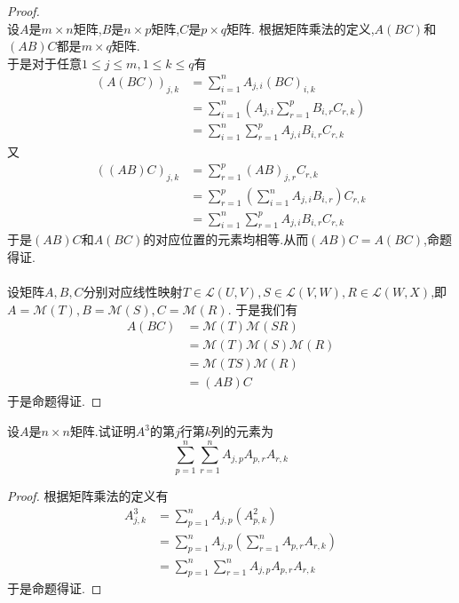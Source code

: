 \documentclass{ctexart}
\begin{document}
\begin{proof}
    \\
    设$A$是$m\times n$矩阵,$B$是$n\times p$矩阵,$C$是$p\times q$矩阵.
    根据矩阵乘法的定义,$A(BC)$和$(AB)C$都是$m\times q$矩阵.\\
    于是对于任意$1\leqslant j\leqslant m,1\leqslant k\leqslant q$有
    $$\begin{aligned}
        (A(BC))_{j,k}
        &= \sum_{i=1}^{n}A_{j,i}(BC)_{i,k} \\
        &= \sum_{i=1}^{n}\left(A_{j,i}\sum_{r=1}^{p}B_{i,r}C_{r,k}\right) \\
        &= \sum_{i=1}^{n}\sum_{r=1}^{p}A_{j,i}B_{i,r}C_{r,k}
    \end{aligned}$$
    又$$\begin{aligned}
        ((AB)C)_{j,k}
        &= \sum_{r=1}^{p}(AB)_{j,r}C_{r,k} \\
        &= \sum_{r=1}^{p}\left(\sum_{i=1}^{n}A_{j,i}B_{i,r}\right)C_{r,k} \\
        &= \sum_{i=1}^{n}\sum_{r=1}^{p}A_{j,i}B_{i,r}C_{r,k}
    \end{aligned}$$
    于是$(AB)C$和$A(BC)$的对应位置的元素均相等.从而$(AB)C=A(BC)$,命题得证.\\
    \\
    设矩阵$A,B,C$分别对应线性映射$T\in\mathcal{L}(U,V),S\in\mathcal{L}(V,W),R\in\mathcal{L}(W,X)$,即$A=\mathcal{M}(T),B=\mathcal{M}(S),C=\mathcal{M}(R)$.
    于是我们有
    $$\begin{aligned}
        A(BC)
        &= \mathcal{M}(T)\mathcal{M}(SR) \\
        &= \mathcal{M}(T)\mathcal{M}(S)\mathcal{M}(R) \\
        &= \mathcal{M}(TS)\mathcal{M}(R) \\
        &= (AB)C
    \end{aligned}$$
    于是命题得证.
\end{proof}
\begin{problem}[13.]
    设$A$是$n\times n$矩阵.试证明$A^3$的第$j$行第$k$列的元素为
    $$\sum_{p=1}^{n}\sum_{r=1}^{n}A_{j,p}A_{p,r}A_{r,k}$$
\end{problem}
\begin{proof}
    根据矩阵乘法的定义有
    $$\begin{aligned}
        A^3_{j,k}
        &= \sum_{p=1}^{n}A_{j,p}\left(A^2_{p,k}\right) \\
        &= \sum_{p=1}^{n}A_{j,p}\left(\sum_{r=1}^{n}A_{p,r}A_{r,k}\right) \\
        &= \sum_{p=1}^{n}\sum_{r=1}^{n}A_{j,p}A_{p,r}A_{r,k}
    \end{aligned}$$
    于是命题得证.
\end{proof}
\end{document}
